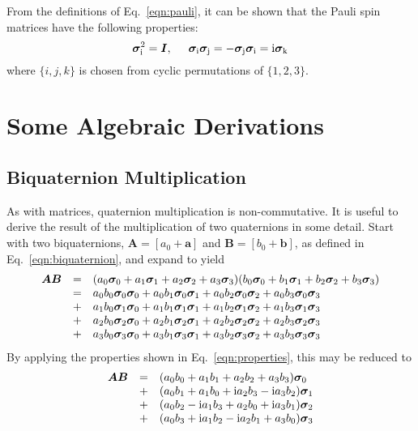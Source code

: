 \documentclass[12pt]{article}
\newcommand{\Ci}{{\rm i}}
\newcommand{\pauli}[1]{\ensuremath{ {\bm\sigma}_{\rm #1} }}
\begin{document}
From the definitions of Eq.~\ref{eqn:pauli}, it can be shown that the
Pauli spin matrices have the following properties:
\begin{equation}\label{eqn:properties}
\pauli{i}^2 = \bm{I}, \hspace{5mm} 
\pauli{i}\pauli{j} = -\pauli{j}\pauli{i} = \Ci\pauli{k}
\end{equation}
where $\{i,j,k\}$ is chosen from cyclic permutations of $\{1,2,3\}$.


\section{Some Algebraic Derivations}

\subsection{Biquaternion Multiplication}
As with matrices, quaternion multiplication is non-commutative.  It is
useful to derive the result of the multiplication of two quaternions
in some detail. Start with two biquaternions, $\bm{A}=[a_0+\bm{a}]$
and $\bm{B}=[b_0+\bm{b}]$, as defined in Eq.~\ref{eqn:biquaternion},
and expand to yield
\begin{eqnarray}
\begin{array}{ccl}
\bm{A}\bm{B} & = &
(a_0\pauli{0} + a_1\pauli{1} + a_2\pauli{2} + a_3\pauli{3})
(b_0\pauli{0} + b_1\pauli{1} + b_2\pauli{2} + b_3\pauli{3}) \\
& = & a_0b_0\pauli{0}\pauli{0} + a_0b_1\pauli{0}\pauli{1}
	+ a_0b_2\pauli{0}\pauli{2} + a_0b_3\pauli{0}\pauli{3} \\
& + & a_1b_0\pauli{1}\pauli{0} + a_1b_1\pauli{1}\pauli{1}
	+ a_1b_2\pauli{1}\pauli{2} + a_1b_3\pauli{1}\pauli{3} \\
& + & a_2b_0\pauli{2}\pauli{0} + a_2b_1\pauli{2}\pauli{1}
	+ a_2b_2\pauli{2}\pauli{2} + a_2b_3\pauli{2}\pauli{3} \\
& + & a_3b_0\pauli{3}\pauli{0} + a_3b_1\pauli{3}\pauli{1}
	+ a_3b_2\pauli{3}\pauli{2} + a_3b_3\pauli{3}\pauli{3}
\end{array}
\end{eqnarray}
By applying the properties shown in Eq.~\ref{eqn:properties}, this may
be reduced to
\begin{eqnarray}\label{eqn:biquaternion_multiplication}
\begin{array}{ccl}
\bm{A}\bm{B}
& = & (a_0b_0 + a_1b_1 + a_2b_2 + a_3b_3) \pauli{0} \\
& + & (a_0b_1 + a_1b_0 + \Ci a_2b_3 - \Ci a_3b_2) \pauli{1} \\
& + & (a_0b_2 - \Ci a_1b_3 + a_2b_0 + \Ci a_3b_1) \pauli{2} \\
& + & (a_0b_3 + \Ci a_1b_2 - \Ci a_2b_1 + a_3b_0) \pauli{3}	
\end{array}
\end{eqnarray}
\end{document}
